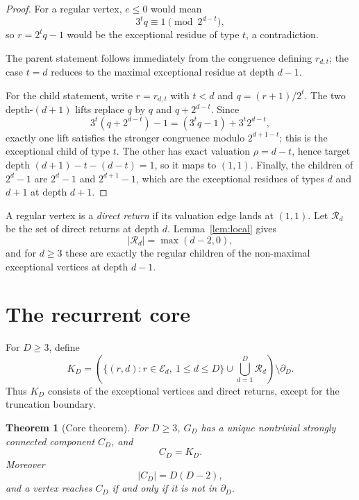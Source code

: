 \documentclass[11pt]{article}
\newtheorem{theorem}{Theorem}[section]
\theoremstyle{definition}
\theoremstyle{remark}
\newcommand{\Ecal}{\mathcal E}
\newcommand{\Rcal}{\mathcal R}
\newcommand{\bdD}{\partial_D}
\begin{document}
\begin{proof}
For a regular vertex, $e\le0$ would mean
\[
3^tq\equiv1\pmod {2^{d-t}},
\]
so $r=2^tq-1$ would be the exceptional residue of type $t$, a contradiction.

The parent statement follows immediately from the congruence defining $r_{d,t}$; the case $t=d$ reduces to the maximal exceptional residue at depth $d-1$.

For the child statement, write $r=r_{d,t}$ with $t<d$ and $q=(r+1)/2^t$.  The two depth-$(d+1)$ lifts replace $q$ by $q$ and $q+2^{d-t}$.  Since
\[
3^t(q+2^{d-t})-1=(3^tq-1)+3^t2^{d-t},
\]
exactly one lift satisfies the stronger congruence modulo $2^{d+1-t}$; this is the exceptional child of type $t$.  The other has exact valuation $\rho=d-t$, hence target depth $(d+1)-t-(d-t)=1$, so it maps to $(1,1)$.  Finally, the children of $2^d-1$ are $2^d-1$ and $2^{d+1}-1$, which are the exceptional residues of types $d$ and $d+1$ at depth $d+1$.
\end{proof}

A regular vertex is a \emph{direct return} if its valuation edge lands at $(1,1)$.  Let $\Rcal_d$ be the set of direct returns at depth $d$.  Lemma~\ref{lem:local} gives
\[
|\Rcal_d|=\max(d-2,0),
\]
and for $d\ge3$ these are exactly the regular children of the non-maximal exceptional vertices at depth $d-1$.

\section{The recurrent core}\label{sec:core}

For $D\ge3$, define
\[
K_D=\left(\{(r,d):r\in\Ecal_d,\ 1\le d\le D\}\cup\bigcup_{d=1}^D\Rcal_d\right)\setminus\bdD.
\]
Thus $K_D$ consists of the exceptional vertices and direct returns, except for the truncation boundary.

\begin{theorem}[Core theorem]\label{thm:core}
For $D\ge3$, $G_D$ has a unique nontrivial strongly connected component $C_D$, and
\[
C_D=K_D.
\]
Moreover
\[
|C_D|=D(D-2),
\]
and a vertex reaches $C_D$ if and only if it is not in $\bdD$.
\end{theorem}
\end{document}
